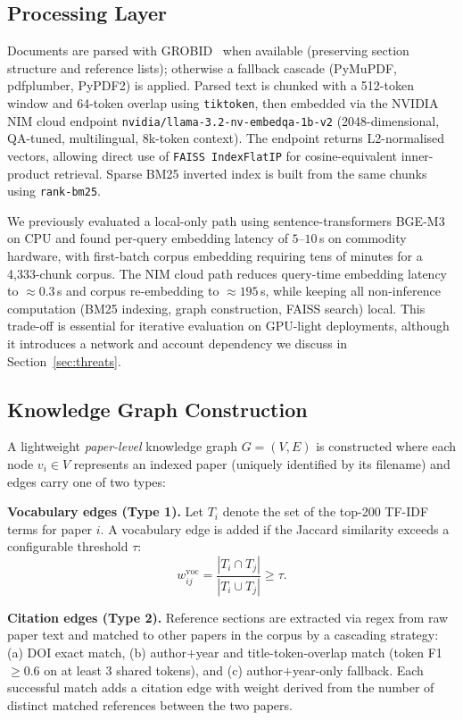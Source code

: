 \documentclass[journal]{IEEEtran}
\begin{document}
\subsection{Processing Layer}
\label{sec:processing}
Documents are parsed with GROBID~\cite{lopez2009grobid} when available
(preserving section structure and reference lists); otherwise a
fallback cascade (PyMuPDF, pdfplumber, PyPDF2) is applied. Parsed text
is chunked with a 512-token window and 64-token overlap using
\texttt{tiktoken}, then embedded via the NVIDIA NIM cloud endpoint
\texttt{nvidia/llama-3.2-nv-embedqa-1b-v2} (2048-dimensional,
QA-tuned, multilingual, 8k-token context). The endpoint returns
L2-normalised vectors, allowing direct use of \texttt{FAISS
IndexFlatIP} for cosine-equivalent inner-product retrieval. Sparse
BM25 inverted index is built from the same chunks using
\texttt{rank-bm25}.

We previously evaluated a local-only path using
sentence-transformers BGE-M3 on CPU and found per-query embedding
latency of $5$--$10$\,s on commodity hardware, with first-batch corpus
embedding requiring tens of minutes for a 4{,}333-chunk corpus. The
NIM cloud path reduces query-time embedding latency to $\approx
0.3$\,s and corpus re-embedding to $\approx 195$\,s, while keeping all
non-inference computation (BM25 indexing, graph construction, FAISS
search) local. This trade-off is essential for iterative evaluation on
GPU-light deployments, although it introduces a network and account
dependency we discuss in Section~\ref{sec:threats}.

\subsection{Knowledge Graph Construction}
\label{sec:kg}
A lightweight \emph{paper-level} knowledge graph $G=(V,E)$ is
constructed where each node $v_i \in V$ represents an indexed paper
(uniquely identified by its filename) and edges carry one of two
types:

\textbf{Vocabulary edges (Type 1).} Let $T_i$ denote the set of the
top-200 TF-IDF terms for paper $i$. A vocabulary edge is added if the
Jaccard similarity exceeds a configurable threshold $\tau$:
\begin{equation}
  w^{\mathrm{voc}}_{ij} = \frac{|T_i \cap T_j|}{|T_i \cup T_j|} \geq \tau.
  \label{eq:jaccard}
\end{equation}

\textbf{Citation edges (Type 2).} Reference sections are extracted via
regex from raw paper text and matched to other papers in the corpus by
a cascading strategy: (a) DOI exact match, (b) author$+$year and
title-token-overlap match (token F1 $\geq 0.6$ on at least 3 shared
tokens), and (c) author$+$year-only fallback. Each successful match
adds a citation edge with weight derived from the number of distinct
matched references between the two papers.
\end{document}
